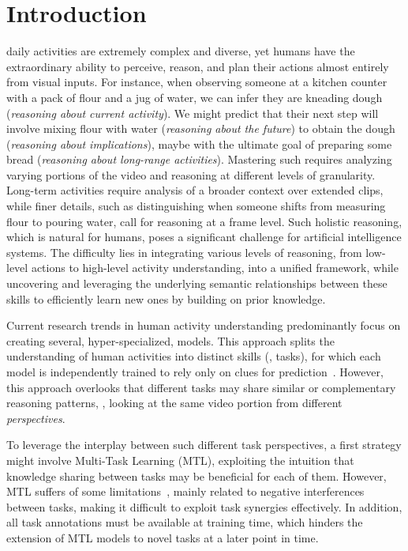 \section{Introduction}\label{sec:intro}
daily activities are extremely complex and diverse, yet humans have the extraordinary ability to perceive, reason, and plan their actions almost entirely from visual inputs.
For instance, when observing someone at a kitchen counter with a pack of flour and a jug of water, we can infer they are kneading dough (\textit{reasoning about current activity}).
We might predict that their next step will involve mixing flour with water (\textit{reasoning about the future}) to obtain the dough (\textit{reasoning about implications}), maybe with the ultimate goal of preparing some bread (\textit{reasoning about long-range activities}).
Mastering such  requires analyzing varying portions of the video and reasoning at different levels of granularity.
Long-term activities require analysis of a broader context over extended clips, while finer details, such as distinguishing when someone shifts from measuring flour to pouring water, call for reasoning at a frame level.
Such holistic reasoning, which is natural for humans, poses a significant challenge for artificial intelligence systems.
The difficulty lies in integrating various levels of reasoning, from low-level actions to high-level activity understanding, into a unified framework, while uncovering and leveraging the underlying semantic relationships between these skills to efficiently learn new ones by building on prior knowledge.

Current research trends in human activity understanding predominantly focus on creating several, hyper-specialized, models. This approach splits the understanding of human activities into distinct skills (\ie, tasks), for which each model is independently trained to rely only on  clues for prediction~\cite{yan2022multiview,zhong2023anticipative,zhang2022actionformer}.
%
However, this approach overlooks that different tasks may share similar or complementary reasoning patterns, \ie, looking at the same video portion from different \textit{perspectives}.

To leverage the interplay between such different task perspectives, a first strategy might involve Multi-Task Learning (MTL), exploiting the intuition that knowledge sharing between tasks may be beneficial for each of them.
However, MTL suffers of some limitations~\cite{kokkinos2017ubernet}, mainly related to negative interferences between tasks, making it difficult to exploit task synergies effectively.
In addition, all task annotations must be available at training time, which hinders the extension of MTL models to novel tasks at a later point in time.

